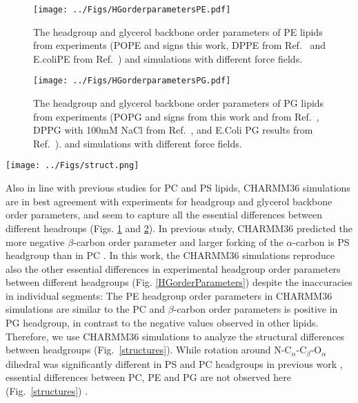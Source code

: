 \documentclass[aps,prl,superscriptaddress,twocolumn]{revtex4}
\begin{document}
\begin{figure}[]
  \centering
  \texttt{[image: ../Figs/HGorderparametersPE.pdf]}
  \caption{\label{HGorderParametersPE}
    The headgroup and glycerol backbone order parameters of PE lipids
    from experiments (POPE and signs this work, DPPE from Ref.~
    and E.coliPE from Ref.~) and simulations with different force fields.
  }
\end{figure}

\begin{figure}[!h]
  \centering
  \texttt{[image: ../Figs/HGorderparametersPG.pdf]}
  \caption{\label{HGorderParametersPOPG}
    The headgroup and glycerol backbone order parameters of PG lipids
    from experiments (POPG and signs from this work and from Ref.~, %
    DPPG with 100mM NaCl from Ref.~,%
    and E.Coli PG results from Ref.~).
    and simulations with different force fields.
  }
\end{figure}
\begin{figure*}[!h]
  \centering
  \texttt{[image: ../Figs/struct.png]}
  \caption{\label{structures}
    Overlayed snapshots from CHARMM36 simulations of different lipids which give the best agreement with experiments.
  }
\end{figure*}
Also in line with previous studies for PC \cite{botan15} and PS \cite{NMRlipidsIVps} lipids,
CHARMM36 simulations are in best agreement with experiments for headgroup and glycerol backbone
order parameters, and seem to capture all the essential differences between different headroups
(Figs. \ref{HGorderParametersPE} and \ref{HGorderParametersPOPG}).
In previous study, CHARMM36 predicted the more negative $\beta$-carbon order parameter and larger forking of
the $\alpha$-carbon is PS headgroup than in PC \cite{NMRlipidsIVps}.
In this work, the CHARMM36 simulations reproduce also the other essential differences in experimental
headgroup order parameters between different headgroups (Fig. \ref{HGorderParameters}) despite the inaccuracies
in individual segments:
The PE headgroup order parameters in CHARMM36 simulations are similar to the PC \cite{botan15}
and $\beta$-carbon order parameters is positive in PG headgroup, in contrast to the negative values observed in
other lipids. Therefore, we use CHARMM36 simulations to analyze the structural differences between
headgroups (Fig.~\ref{structures}). While rotation around N-C$_\alpha$-C$_\beta$-O$_\alpha$ dihedral was
significantly different in PS and PC headgroups in previous work \cite{NMRlipidsIVps}, essential differences
between PC, PE and PG are not observed here (Fig.~\ref{structures}) . \\
\end{document}
